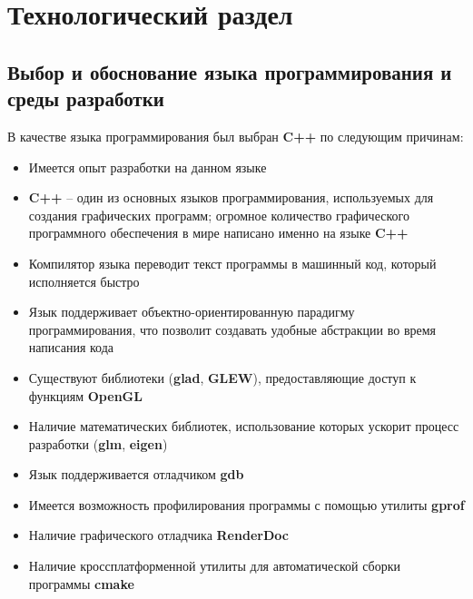 \newpage
\section{Технологический раздел}

\subsection{Выбор и обоснование языка программирования и среды разработки}

В качестве языка программирования был выбран \textbf{C++} по следующим причинам:
\begin{itemize}
    \item Имеется опыт разработки на данном языке
    \item \textbf{C++} -- один из основных языков программирования, используемых для создания графических программ; огромное количество графического программного обеспечения в мире написано именно на языке \textbf{C++}
    \item Компилятор языка переводит текст программы в машинный код, который исполняется быстро
    \item Язык поддерживает объектно-ориентированную парадигму программирования, что позволит создавать удобные абстракции во время написания кода
    \item Существуют библиотеки (\textbf{glad}, \textbf{GLEW}), предоставляющие доступ к функциям \textbf{OpenGL}
    \item Наличие математических библиотек, использование которых ускорит процесс разработки (\textbf{glm}, \textbf{eigen})
    \item Язык поддерживается отладчиком \textbf{gdb}
    \item Имеется возможность профилирования программы с помощью утилиты \textbf{gprof}
    \item Наличие графического отладчика \textbf{RenderDoc}
    \item Наличие кроссплатформенной утилиты для автоматической сборки программы \textbf{cmake}
\end{itemize}

